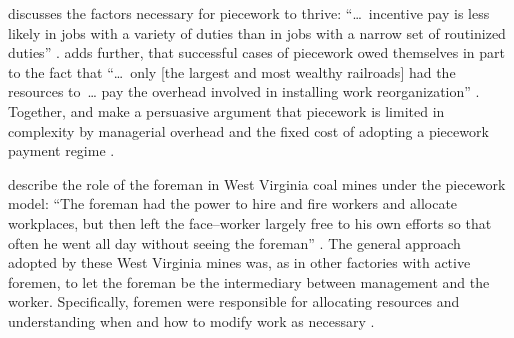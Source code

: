\documentclass[trackingWork]{subfiles}
\begin{document}
 
\citeauthor{Brown01041990} discusses the factors necessary for piecework to thrive:
    ``\dots~incentive pay is less likely in jobs with
    a variety of duties than in jobs with a narrow set of routinized duties''
\cite{Brown01041990} .
\citeauthor{10.2307/23702539} adds further, that
successful cases of piecework owed themselves in part to the fact that
    ``\dots~only [the largest and most wealthy railroads] had the resources to~\dots
    pay the overhead involved in installing work reorganization''
\cite{10.2307/23702539}.
Together, \citeauthor{10.2307/23702539} and \citeauthor{Brown01041990}
make a persuasive argument that piecework is limited in complexity by
managerial overhead  and the fixed cost of adopting a piecework payment regime .

\citeauthor{10.2307/2118435} describe the role of the foreman in West Virginia coal mines under the piecework model:
``The foreman had the power to hire and fire workers and allocate workplaces,
but then left the face--worker largely free to his own efforts so that
often he went all day without seeing the foreman''
\cite{10.2307/2118435}.
The general approach adopted by these West Virginia mines was,
as in other factories with active foremen,
to let the foreman be the intermediary between management and the worker.
Specifically, foremen were responsible for allocating resources and
understanding when and how to modify work as necessary
\cite{wray1949marginal}. 
\end{document}
